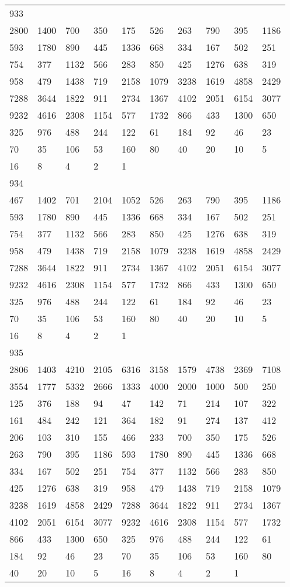 \begin{longtable}{*{10}{l}}
933&&&&&&&&&\\
2800& 1400& 700& 350& 175& 526& 263& 790& 395& 1186\\
593& 1780& 890& 445& 1336& 668& 334& 167& 502& 251\\
754& 377& 1132& 566& 283& 850& 425& 1276& 638& 319\\
958& 479& 1438& 719& 2158& 1079& 3238& 1619& 4858& 2429\\
7288& 3644& 1822& 911& 2734& 1367& 4102& 2051& 6154& 3077\\
9232& 4616& 2308& 1154& 577& 1732& 866& 433& 1300& 650\\
325& 976& 488& 244& 122& 61& 184& 92& 46& 23\\
70& 35& 106& 53& 160& 80& 40& 20& 10& 5\\
16& 8& 4& 2& 1& \\

934&&&&&&&&&\\
467& 1402& 701& 2104& 1052& 526& 263& 790& 395& 1186\\
593& 1780& 890& 445& 1336& 668& 334& 167& 502& 251\\
754& 377& 1132& 566& 283& 850& 425& 1276& 638& 319\\
958& 479& 1438& 719& 2158& 1079& 3238& 1619& 4858& 2429\\
7288& 3644& 1822& 911& 2734& 1367& 4102& 2051& 6154& 3077\\
9232& 4616& 2308& 1154& 577& 1732& 866& 433& 1300& 650\\
325& 976& 488& 244& 122& 61& 184& 92& 46& 23\\
70& 35& 106& 53& 160& 80& 40& 20& 10& 5\\
16& 8& 4& 2& 1& \\

935&&&&&&&&&\\
2806& 1403& 4210& 2105& 6316& 3158& 1579& 4738& 2369& 7108\\
3554& 1777& 5332& 2666& 1333& 4000& 2000& 1000& 500& 250\\
125& 376& 188& 94& 47& 142& 71& 214& 107& 322\\
161& 484& 242& 121& 364& 182& 91& 274& 137& 412\\
206& 103& 310& 155& 466& 233& 700& 350& 175& 526\\
263& 790& 395& 1186& 593& 1780& 890& 445& 1336& 668\\
334& 167& 502& 251& 754& 377& 1132& 566& 283& 850\\
425& 1276& 638& 319& 958& 479& 1438& 719& 2158& 1079\\
3238& 1619& 4858& 2429& 7288& 3644& 1822& 911& 2734& 1367\\
4102& 2051& 6154& 3077& 9232& 4616& 2308& 1154& 577& 1732\\
866& 433& 1300& 650& 325& 976& 488& 244& 122& 61\\
184& 92& 46& 23& 70& 35& 106& 53& 160& 80\\
40& 20& 10& 5& 16& 8& 4& 2& 1& \\


\end{longtable}
